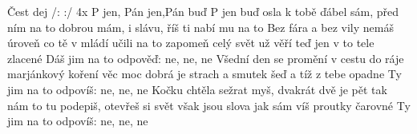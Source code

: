 \begin{TEXT}{Čest dej}
\REFREN  /:  :/                      4x \NL
  P jen, Pán jen,Pán buď  \NL             %
P jen  buď osla 
\SLOKA {} k tobě ďábel sám,  před ním  \NL
na to dobrou  mám,   \NL
{} i slávu,  říš  ti nabí \NL
{} mu na to     
\SLOKA Bez fára a bez vily nemáš úroveň \NL
co tě v mládí učili na to zapomeň \NL
celý svět už věří teď jen v to tele zlacené \NL
Dáš jim na to odpověď: ne, ne, ne 
\SLOKA Všední den se promění v cestu do ráje \NL
marjánkový koření věc moc dobrá je \NL
strach a smutek šeď a tíž z tebe opadne \NL
Ty jim na to odpovíš: ne, ne, ne 
\SLOKA Kočku chtěla sežrat myš, dvakrát dvě je pět \NL
tak nám to tu podepiš, otevřeš si svět \NL
však jsou slova jak sám víš proutky čarovné \NL
Ty jim na to odpovíš: ne, ne, ne \NL
\end{TEXT}
